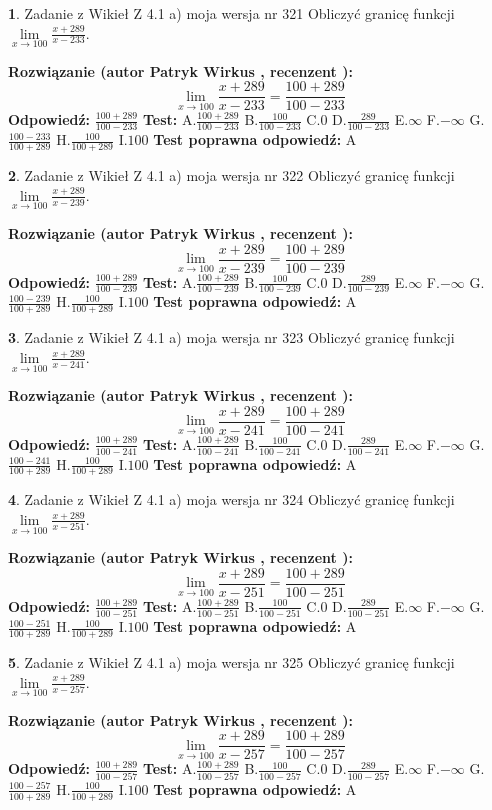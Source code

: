 \documentclass[12pt, a4paper]{article}
\theoremstyle{definition} %
\newtheorem{zad}{}
\newcommand{\zadStart}[1]{\begin{zad}#1\newline}
\newcommand{\zadStop}{\end{zad}}
\newcommand{\rozwStart}[2]{\noindent \textbf{Rozwiązanie (autor #1 , recenzent #2): }\newline}
\newcommand{\rozwStop}{\newline}
\newcommand{\odpStart}{\noindent \textbf{Odpowiedź:}\newline}
\newcommand{\odpStop}{\newline}
\newcommand{\testStart}{\noindent \textbf{Test:}\newline}
\newcommand{\testStop}{\newline}
\newcommand{\kluczStart}{\noindent \textbf{Test poprawna odpowiedź:}\newline}
\newcommand{\kluczStop}{\newline}
\begin{document}
\zadStart{Zadanie z Wikieł Z 4.1 a) moja wersja nr 321}
Obliczyć granicę funkcji $\lim\limits_{x\to100}\frac{x+289}{x-233}$.
\zadStop
\rozwStart{Patryk Wirkus}{}
$$\lim\limits_{x\to100}\frac{x+289}{x-233} = \frac{100+289}{100-233}$$
\rozwStop
\odpStart
$\frac{100+289}{100-233}$
\odpStop
\testStart
A.$\frac{100+289}{100-233}$
B.$\frac{100}{100-233}$
C.$0$
D.$\frac{289}{100-233}$
E.$\infty$
F.$-\infty$
G.$\frac{100-233}{100+289}$
H.$\frac{100}{100+289}$
I.$100$
\testStop
\kluczStart
A
\kluczStop



\zadStart{Zadanie z Wikieł Z 4.1 a) moja wersja nr 322}
Obliczyć granicę funkcji $\lim\limits_{x\to100}\frac{x+289}{x-239}$.
\zadStop
\rozwStart{Patryk Wirkus}{}
$$\lim\limits_{x\to100}\frac{x+289}{x-239} = \frac{100+289}{100-239}$$
\rozwStop
\odpStart
$\frac{100+289}{100-239}$
\odpStop
\testStart
A.$\frac{100+289}{100-239}$
B.$\frac{100}{100-239}$
C.$0$
D.$\frac{289}{100-239}$
E.$\infty$
F.$-\infty$
G.$\frac{100-239}{100+289}$
H.$\frac{100}{100+289}$
I.$100$
\testStop
\kluczStart
A
\kluczStop



\zadStart{Zadanie z Wikieł Z 4.1 a) moja wersja nr 323}
Obliczyć granicę funkcji $\lim\limits_{x\to100}\frac{x+289}{x-241}$.
\zadStop
\rozwStart{Patryk Wirkus}{}
$$\lim\limits_{x\to100}\frac{x+289}{x-241} = \frac{100+289}{100-241}$$
\rozwStop
\odpStart
$\frac{100+289}{100-241}$
\odpStop
\testStart
A.$\frac{100+289}{100-241}$
B.$\frac{100}{100-241}$
C.$0$
D.$\frac{289}{100-241}$
E.$\infty$
F.$-\infty$
G.$\frac{100-241}{100+289}$
H.$\frac{100}{100+289}$
I.$100$
\testStop
\kluczStart
A
\kluczStop



\zadStart{Zadanie z Wikieł Z 4.1 a) moja wersja nr 324}
Obliczyć granicę funkcji $\lim\limits_{x\to100}\frac{x+289}{x-251}$.
\zadStop
\rozwStart{Patryk Wirkus}{}
$$\lim\limits_{x\to100}\frac{x+289}{x-251} = \frac{100+289}{100-251}$$
\rozwStop
\odpStart
$\frac{100+289}{100-251}$
\odpStop
\testStart
A.$\frac{100+289}{100-251}$
B.$\frac{100}{100-251}$
C.$0$
D.$\frac{289}{100-251}$
E.$\infty$
F.$-\infty$
G.$\frac{100-251}{100+289}$
H.$\frac{100}{100+289}$
I.$100$
\testStop
\kluczStart
A
\kluczStop



\zadStart{Zadanie z Wikieł Z 4.1 a) moja wersja nr 325}
Obliczyć granicę funkcji $\lim\limits_{x\to100}\frac{x+289}{x-257}$.
\zadStop
\rozwStart{Patryk Wirkus}{}
$$\lim\limits_{x\to100}\frac{x+289}{x-257} = \frac{100+289}{100-257}$$
\rozwStop
\odpStart
$\frac{100+289}{100-257}$
\odpStop
\testStart
A.$\frac{100+289}{100-257}$
B.$\frac{100}{100-257}$
C.$0$
D.$\frac{289}{100-257}$
E.$\infty$
F.$-\infty$
G.$\frac{100-257}{100+289}$
H.$\frac{100}{100+289}$
I.$100$
\testStop
\kluczStart
A
\kluczStop
\end{document}
